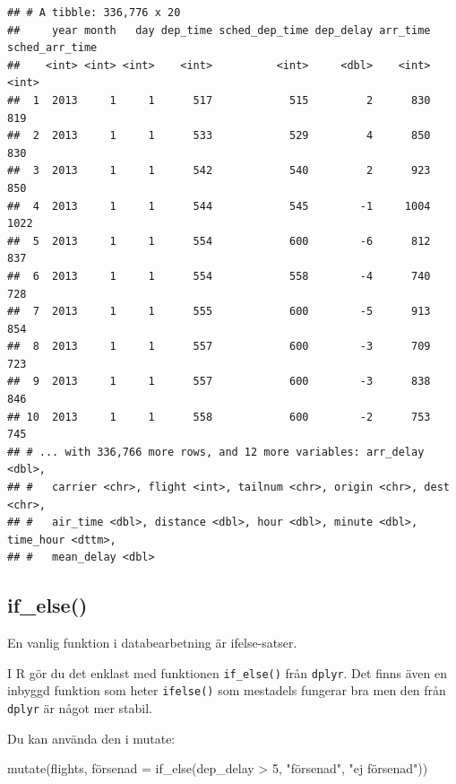 \documentclass[
]{book}
\newenvironment{Shaded}{\begin{snugshade}}{\end{snugshade}}
\newcommand{\DecValTok}[1]{\textcolor[rgb]{0.00,0.00,0.81}{#1}}
\newcommand{\FunctionTok}[1]{\textcolor[rgb]{0.00,0.00,0.00}{#1}}
\newcommand{\NormalTok}[1]{#1}
\newcommand{\OtherTok}[1]{\textcolor[rgb]{0.56,0.35,0.01}{#1}}
\newcommand{\SpecialCharTok}[1]{\textcolor[rgb]{0.00,0.00,0.00}{#1}}
\newcommand{\StringTok}[1]{\textcolor[rgb]{0.31,0.60,0.02}{#1}}
\begin{document}
\begin{verbatim}
## # A tibble: 336,776 x 20
##     year month   day dep_time sched_dep_time dep_delay arr_time sched_arr_time
##    <int> <int> <int>    <int>          <int>     <dbl>    <int>          <int>
##  1  2013     1     1      517            515         2      830            819
##  2  2013     1     1      533            529         4      850            830
##  3  2013     1     1      542            540         2      923            850
##  4  2013     1     1      544            545        -1     1004           1022
##  5  2013     1     1      554            600        -6      812            837
##  6  2013     1     1      554            558        -4      740            728
##  7  2013     1     1      555            600        -5      913            854
##  8  2013     1     1      557            600        -3      709            723
##  9  2013     1     1      557            600        -3      838            846
## 10  2013     1     1      558            600        -2      753            745
## # ... with 336,766 more rows, and 12 more variables: arr_delay <dbl>,
## #   carrier <chr>, flight <int>, tailnum <chr>, origin <chr>, dest <chr>,
## #   air_time <dbl>, distance <dbl>, hour <dbl>, minute <dbl>, time_hour <dttm>,
## #   mean_delay <dbl>
\end{verbatim}

\hypertarget{if_else}{%
\subsection{if\_else()}\label{if_else}}

En vanlig funktion i databearbetning är ifelse-satser.

I R gör du det enklast med funktionen \texttt{if\_else()} från \texttt{dplyr}. Det finns även en inbyggd funktion som heter \texttt{ifelse()} som mestadels fungerar bra men den från \texttt{dplyr} är något mer stabil.

Du kan använda den i mutate:

\begin{Shaded}
\begin{Highlighting}[]
\FunctionTok{mutate}\NormalTok{(flights, försenad }\OtherTok{=} \FunctionTok{if\_else}\NormalTok{(dep\_delay  }\SpecialCharTok{\textgreater{}} \DecValTok{5}\NormalTok{, }\StringTok{"försenad"}\NormalTok{, }\StringTok{"ej försenad"}\NormalTok{))}
\end{Highlighting}
\end{Shaded}
\end{document}

